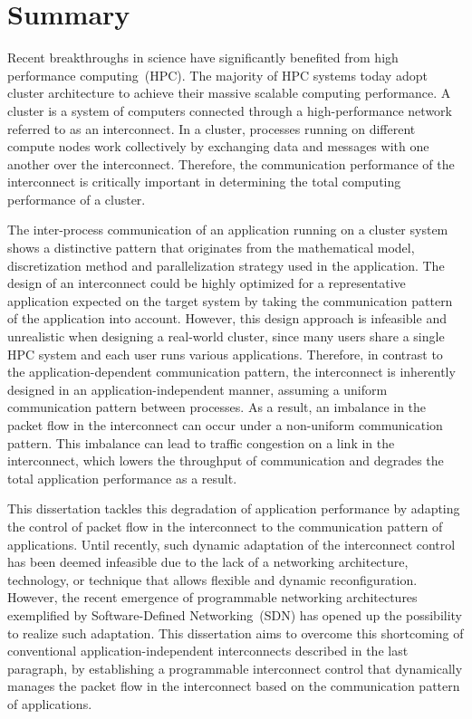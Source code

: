 \pagestyle{myheadings}
\markright{}
\chapter*{Summary}

Recent breakthroughs in science have significantly benefited from high
performance computing~(HPC). The majority of HPC systems today adopt cluster
architecture to achieve their massive scalable computing performance. A
cluster is a system of computers connected through a high-performance network
referred to as an interconnect. In a cluster, processes running on different
compute nodes work collectively by exchanging data and messages with one
another over the interconnect. Therefore, the communication performance of the
interconnect is critically important in determining the total computing
performance of a cluster.

The inter-process communication of an application running on a cluster system
shows a distinctive pattern that originates from the mathematical model,
discretization method and parallelization strategy used in the application.
The design of an interconnect could be highly optimized for a representative
application expected on the target system by taking the communication pattern
of the application into account. However, this design approach is infeasible
and unrealistic when designing a real-world cluster, since many users share a
single HPC system and each user runs various applications. Therefore, in
contrast to the application-dependent communication pattern, the interconnect
is inherently designed in an application-independent manner, assuming a
uniform communication pattern between processes. As a result, an imbalance in
the packet flow in the interconnect can occur under a non-uniform
communication pattern. This imbalance can lead to traffic congestion on a link
in the interconnect, which lowers the throughput of communication and degrades
the total application performance as a result.

This dissertation tackles this degradation of application performance by
adapting the control of packet flow in the interconnect to the communication
pattern of applications. Until recently, such dynamic adaptation of the
interconnect control has been deemed infeasible due to the lack of a
networking architecture, technology, or technique that allows flexible and
dynamic reconfiguration. However, the recent emergence of programmable
networking architectures exemplified by Software-Defined Networking~(SDN) has
opened up the possibility to realize such adaptation. This dissertation aims
to overcome this shortcoming of conventional application-independent
interconnects described in the last paragraph, by establishing a programmable
interconnect control that dynamically manages the packet flow in the
interconnect based on the communication pattern of applications.

